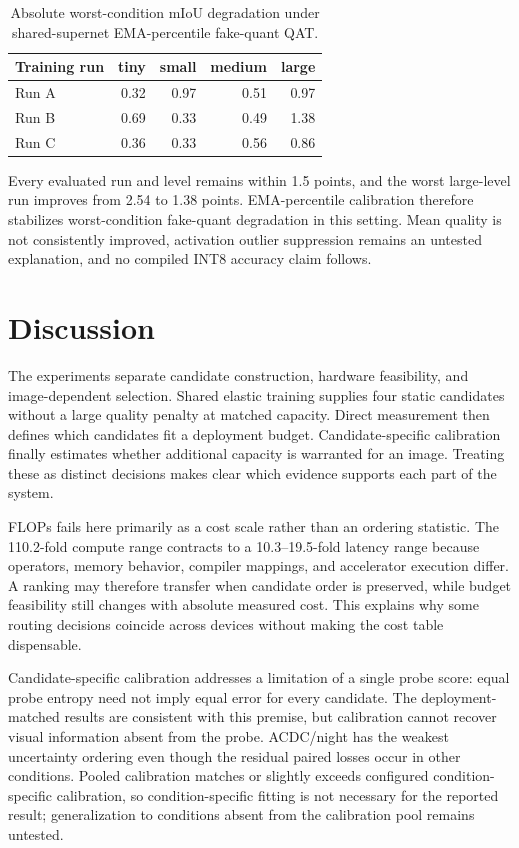 \documentclass[a4paper,review,12pt]{elsarticle}
\newcommand{\miou}{mIoU}
\begin{document}
\begin{table}[H]
\centering
\caption{Absolute worst-condition \miou{} degradation under shared-supernet EMA-percentile fake-quant QAT.}
\label{tab:qat}
\begin{tabular}{@{}lrrrr@{}}
\toprule
Training run & tiny & small & medium & large \\
\midrule
Run A & 0.32 & 0.97 & 0.51 & 0.97 \\
Run B & 0.69 & 0.33 & 0.49 & 1.38 \\
Run C & 0.36 & 0.33 & 0.56 & 0.86 \\
\bottomrule
\end{tabular}
\end{table}

Every evaluated run and level remains within 1.5 points, and the worst large-level run improves from 2.54 to 1.38 points. EMA-percentile calibration therefore stabilizes worst-condition fake-quant degradation in this setting. Mean quality is not consistently improved, activation outlier suppression remains an untested explanation, and no compiled INT8 accuracy claim follows.

\section{Discussion}
\label{sec:discussion}

The experiments separate candidate construction, hardware feasibility, and image-dependent selection. Shared elastic training supplies four static candidates without a large quality penalty at matched capacity. Direct measurement then defines which candidates fit a deployment budget. Candidate-specific calibration finally estimates whether additional capacity is warranted for an image. Treating these as distinct decisions makes clear which evidence supports each part of the system.

FLOPs fails here primarily as a cost scale rather than an ordering statistic. The 110.2-fold compute range contracts to a 10.3--19.5-fold latency range because operators, memory behavior, compiler mappings, and accelerator execution differ. A ranking may therefore transfer when candidate order is preserved, while budget feasibility still changes with absolute measured cost. This explains why some routing decisions coincide across devices without making the cost table dispensable.

Candidate-specific calibration addresses a limitation of a single probe score: equal probe entropy need not imply equal error for every candidate. The deployment-matched results are consistent with this premise, but calibration cannot recover visual information absent from the probe. ACDC/night has the weakest uncertainty ordering even though the residual paired losses occur in other conditions. Pooled calibration matches or slightly exceeds configured condition-specific calibration, so condition-specific fitting is not necessary for the reported result; generalization to conditions absent from the calibration pool remains untested.
\end{document}
